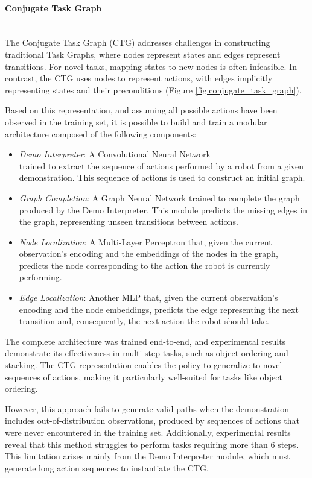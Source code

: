 \paragraph*{Conjugate Task Graph} \mbox{}\\
The Conjugate Task Graph (CTG) \cite{huang2019neural} addresses challenges in constructing traditional Task Graphs, where nodes represent states and edges represent transitions. For novel tasks, mapping states to new nodes is often infeasible. In contrast, the CTG uses nodes to represent actions, with edges implicitly representing states and their preconditions (Figure \ref{fig:conjugate_task_graph}).

Based on this representation, and assuming all possible actions have been observed in the training set, it is possible to build and train a modular architecture composed of the following components:
\begin{itemize}
    \item \textit{Demo Interpreter}: A Convolutional Neural Network \\ trained to extract the sequence of actions performed by a robot from a given demonstration. This sequence of actions is used to construct an initial graph.
    
    \item \textit{Graph Completion}: A Graph Neural Network trained to complete the graph produced by the Demo Interpreter. This module predicts the missing edges in the graph, representing unseen transitions between actions.
    
    \item \textit{Node Localization}: A Multi-Layer Perceptron that, given the current observation's encoding and the embeddings of the nodes in the graph, predicts the node corresponding to the action the robot is currently performing.
    
    \item \textit{Edge Localization}: Another MLP that, given the current observation's encoding and the node embeddings, predicts the edge representing the next transition and, consequently, the next action the robot should take.
\end{itemize}

The complete architecture was trained end-to-end, and experimental results demonstrate its effectiveness in multi-step tasks, such as object ordering and stacking. The CTG representation enables the policy to generalize to novel sequences of actions, making it particularly well-suited for tasks like object ordering.

However, this approach fails to generate valid paths when the demonstration includes out-of-distribution observations, produced by sequences of actions that were never encountered in the training set. Additionally, experimental results reveal that this method struggles to perform tasks requiring more than 6 steps. This limitation arises mainly from the Demo Interpreter module, which must generate long action sequences to instantiate the CTG.
